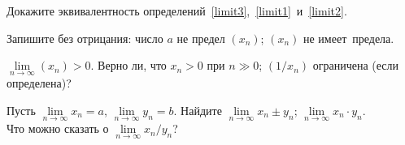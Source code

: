 \documentclass[a4paper, 12pt]{article}
\begin{document}

 Докажите эквивалентность
определений~\ref{limit3},~\ref{limit1}~и~\ref{limit2}.


Запишите %
без отрицания:
 число
$a$ не предел %
$(x_n)$;
$(x_n)$ не имеет~предела.


$\lim\limits_{n \to \infty}(x_n)>0$. %
Верно ли, что
 $\!\!x_n>0$ при $n\gg0$;
 $\!\!(1/x_n)$ ограничена (если определена)?



Пусть
$\lim\limits_{n \to \infty} x_n = a$,
$\lim\limits_{n \to \infty} y_n = b$.
Найдите
 $\lim\limits_{n \to \infty} x_n \pm y_n$;
 $\lim\limits_{n \to \infty} x_n\cdot y_n$.\\
Что можно сказать о
$\lim\limits_{n \to \infty} x_n/y_n$?
\end{document}
